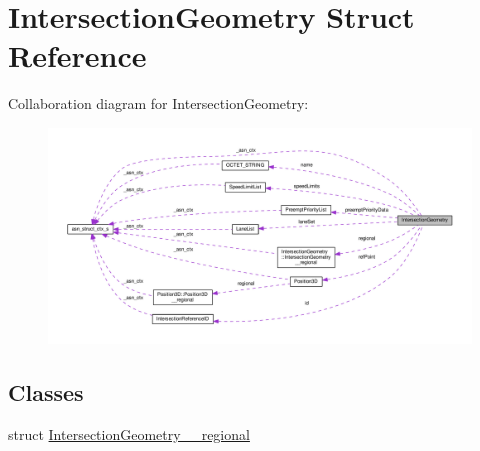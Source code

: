 \hypertarget{structIntersectionGeometry}{}\section{Intersection\+Geometry Struct Reference}
\label{structIntersectionGeometry}


Collaboration diagram for Intersection\+Geometry\+:\nopagebreak
\begin{figure}[H]
\begin{center}
\leavevmode
\includegraphics[width=350pt]{structIntersectionGeometry__coll__graph}
\end{center}
\end{figure}
\subsection*{Classes}
\begin{DoxyCompactItemize}
\item 
struct \hyperlink{structIntersectionGeometry_1_1IntersectionGeometry____regional}{Intersection\+Geometry\+\_\+\+\_\+regional}
\end{DoxyCompactItemize}
